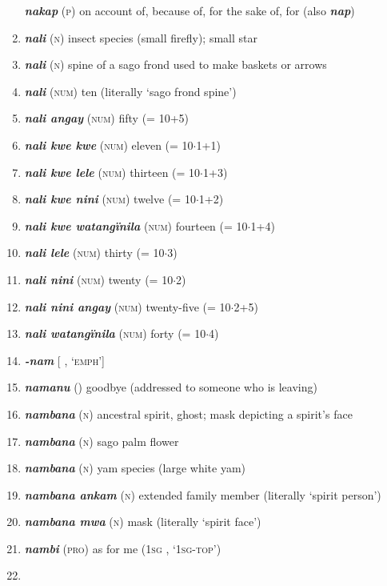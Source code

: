 \begin{enumerate}[noitemsep, label={}, align=left, widest=190, labelsep=1ex,leftmargin=*,itemindent=-10pt]
\textbf{\textit{nakap}} (\textsc{p}) on account of, because of, for the sake of, for (also \textbf{\textit{nap}}) \item 
\textbf{\textit{nali}} (\textsc{n}) insect species (small firefly); small star \item 
\textbf{\textit{nali}} (\textsc{n}) spine of a sago frond used to make baskets or arrows \item 
\textbf{\textit{nali}} (\textsc{num}) ten (literally ‘sago frond spine’) \item 
\textbf{\textit{nali angay}} (\textsc{num}) fifty (= 10+5) \item 
\textbf{\textit{nali kwe kwe}} (\textsc{num}) eleven (= 10${\cdot}$1+1) \item 
\textbf{\textit{nali kwe lele}} (\textsc{num}) thirteen (= 10${\cdot}$1+3) \item 
\textbf{\textit{nali kwe nini}} (\textsc{num}) twelve (= 10${\cdot}$1+2) \item 
\textbf{\textit{nali kwe watangïnila}} (\textsc{num}) fourteen (= 10${\cdot}$1+4) \item 
\textbf{\textit{nali lele}} (\textsc{num}) thirty (= 10${\cdot}$3) \item 
\textbf{\textit{nali nini}} (\textsc{num}) twenty (= 10${\cdot}$2) \item 
\textbf{\textit{nali nini angay}} (\textsc{num}) twenty-five (= 10${\cdot}$2+5) \item 
\textbf{\textit{nali watangïnila}} (\textsc{num}) forty (= 10${\cdot}$4) \item 
\textbf{\textit{-nam}} [ , ‘\textsc{emph}’] \item 
\textbf{\textit{namanu}} () goodbye (addressed to someone who is leaving) \item 
\textbf{\textit{nambana}} (\textsc{n}) ancestral spirit, ghost; mask depicting a spirit’s face \item 
\textbf{\textit{nambana}} (\textsc{n}) sago palm flower \item 
\textbf{\textit{nambana}} (\textsc{n}) yam species (large white yam) \item 
\textbf{\textit{nambana ankam}} (\textsc{n}) extended family member (literally ‘spirit person’) \item 
\textbf{\textit{nambana mwa}} (\textsc{n}) mask (literally ‘spirit face’) \item 
\textbf{\textit{nambi}} (\textsc{pro}) as for me (1\textsc{sg} , ‘\textsc{1sg-top}’) \item 

\end{enumerate}
